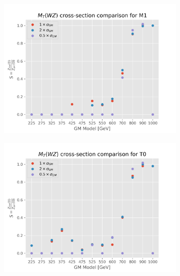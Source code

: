 \documentclass[../Bachelorarbeit.tex]{subfiles}
\begin{document}
\begin{figure}[h]
\begin{subfigure}{0.45\textwidth}
        \includegraphics[width=\textwidth]{Plots/gm_relevanze/MTWZ_comparision_M1.png}
    \end{subfigure}
    \begin{subfigure}{0.45\textwidth}
        \includegraphics[width=\textwidth]{Plots/gm_relevanze/MTWZ_comparision_T0.png}
    \end{subfigure}
    \begin{subfigure}{0.45\textwidth}

\end{subfigure}
\end{figure}
\end{document}

